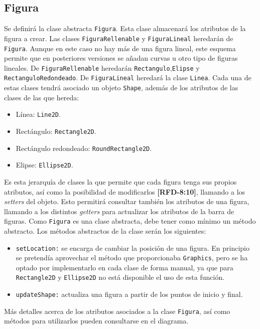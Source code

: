\subsection{Figura}
Se definirá la clase abstracta \texttt{Figura}. Esta clase almacenará los atributos de la figura a crear. Las clases \texttt{FiguraRellenable} y \texttt{FiguraLineal} heredarán de \texttt{Figura}. Aunque en este caso no hay más de una figura lineal, este esquema permite que en posteriores versiones se añadan curvas u otro tipo de figuras lineales. \vskip0.3cm
De \texttt{FiguraRellenable} heredarán \texttt{Rectangulo},\texttt{Elipse} y \texttt{RectanguloRedondeado}. De \texttt{FiguraLineal} heredará la clase \texttt{Linea}. Cada una de estas clases tendrá asociado un objeto \texttt{Shape}, además de los atributos de las clases de las que hereda:\begin{itemize}
\item{Línea: \texttt{Line2D}.}
\item{Rectángulo: \texttt{Rectangle2D}.}
\item{Rectángulo redondeado: \texttt{RoundRectangle2D}.}
\item{Elipse: \texttt{Ellipse2D}.}
\end{itemize}
\vskip0.3cm
Es esta jerarquía de clases la que permite que cada figura tenga sus propios atributos, así como la posibilidad de modificarlos \textbf{[RFD-8:10]}, llamando a los \textit{setters} del objeto.\vskip0.3cm
Esto permitirá consultar también los atributos de una figura, llamando a los distintos \textit{getters} para actualizar los atributos de la barra de figuras. Como \texttt{Figura} es una clase abstracta, debe tener como mínimo un método abstracto. Los métodos abstractos de la clase serán los siguientes:
\begin{itemize}
\item{\texttt{setLocation:} se encarga de cambiar la posición de una figura. En principio se pretendía aprovechar el método que proporcionaba \texttt{Graphics}, pero se ha optado por implementarlo en cada clase de forma manual, ya que para \texttt{Rectangle2D} y \texttt{Ellipse2D} no está disponible el uso de esta función.}
\item{\texttt{updateShape:} actualiza una figura a partir de los puntos de inicio y final.}
\end{itemize}
Más detalles acerca de los atributos asociados a la clase \texttt{Figura}, así como métodos para utilizarlos pueden consultarse en el diagrama.
\vskip0.3cm
